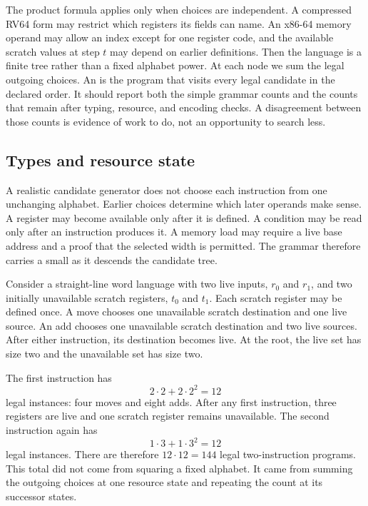 The product formula applies only when choices are independent. A compressed
RV64 form may restrict which registers its fields can name. An x86-64 memory
operand may allow an index except for one register code, and the available
scratch values at step \(t\) may depend on earlier definitions. Then the
language is a finite tree rather than a fixed alphabet power. At each node we
sum the legal outgoing choices. An  is the program that
visits every legal candidate in the declared order. It should report both
the simple grammar counts and the counts that remain after typing, resource,
and encoding checks. A disagreement between those counts is evidence of work
to do, not an opportunity to search less.

\subsection{Types and resource state}

A realistic candidate generator does not choose each instruction from one
unchanging alphabet. Earlier choices determine which later operands make
sense. A register may become available only after it is defined. A condition
may be read only after an instruction produces it. A memory load may require a
live base address and a proof that the selected width is permitted. The
grammar therefore carries a small  as it descends the
candidate tree.

Consider a straight-line word language with two live inputs, \(r_0\) and
\(r_1\), and two initially unavailable scratch registers, \(t_0\) and \(t_1\).
Each scratch register may be defined once. A move chooses one unavailable
scratch destination and one live source. An add chooses one unavailable
scratch destination and two live sources. After either instruction, its
destination becomes live. At the root, the live set has size two and the
unavailable set has size two.

The first instruction has
\[
  2\cdot2+2\cdot2^2=12
\]
legal instances: four moves and eight adds. After any first instruction, three
registers are live and one scratch register remains unavailable. The second
instruction again has
\[
  1\cdot3+1\cdot3^2=12
\]
legal instances. There are therefore \(12\cdot12=144\) legal two-instruction
programs. This total did not come from squaring a fixed alphabet. It came from
summing the outgoing choices at one resource state and repeating the count at
its successor states.

